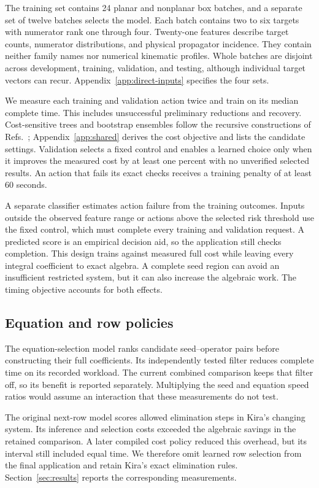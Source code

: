 \documentclass[11pt,a4paper]{article}
\begin{document}
The training set contains 24 planar and nonplanar box batches, and a separate set of twelve batches selects the model. Each batch contains two to six targets with numerator rank one through four. Twenty-one features describe target counts, numerator distributions, and physical propagator incidence. They contain neither family names nor numerical kinematic profiles. Whole batches are disjoint across development, training, validation, and testing, although individual target vectors can recur. Appendix~\ref{app:direct-inputs} specifies the four sets.

We measure each training and validation action twice and train on its median complete time. This includes unsuccessful preliminary reductions and recovery. Cost-sensitive trees and bootstrap ensembles follow the recursive constructions of Refs.~\cite{CART1984,Breiman2001Forest}; Appendix~\ref{app:shared} derives the cost objective and lists the candidate settings. Validation selects a fixed control and enables a learned choice only when it improves the measured cost by at least one percent with no unverified selected results. An action that fails its exact checks receives a training penalty of at least 60 seconds.

A separate classifier estimates action failure from the training outcomes. Inputs outside the observed feature range or actions above the selected risk threshold use the fixed control, which must complete every training and validation request. A predicted score is an empirical decision aid, so the application still checks completion. This design trains against measured full cost while leaving every integral coefficient to exact algebra. A complete seed region can avoid an insufficient restricted system, but it can also increase the algebraic work. The timing objective accounts for both effects.

\subsection{Equation and row policies}
The equation-selection model ranks candidate seed--operator pairs before constructing their full coefficients. Its independently tested filter reduces complete time on its recorded workload. The current combined comparison keeps that filter off, so its benefit is reported separately. Multiplying the seed and equation speed ratios would assume an interaction that these measurements do not test.

The original next-row model scores allowed elimination steps in Kira's changing system. Its inference and selection costs exceeded the algebraic savings in the retained comparison. A later compiled cost policy reduced this overhead, but its interval still included equal time. We therefore omit learned row selection from the final application and retain Kira's exact elimination rules. Section~\ref{sec:results} reports the corresponding measurements.
\end{document}
